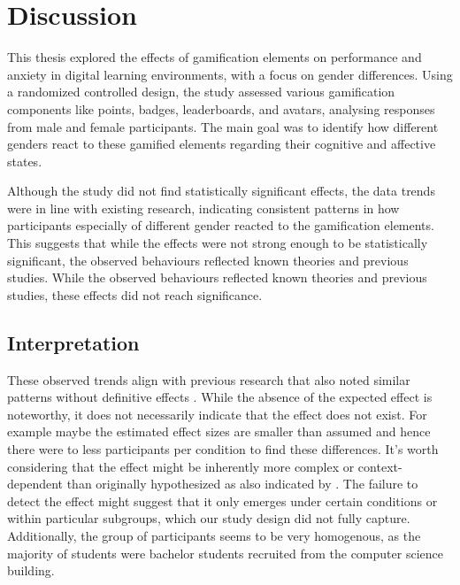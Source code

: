 \section{Discussion}
This thesis explored the effects of gamification elements on performance and anxiety in digital learning environments, with a focus on gender differences.
Using a randomized controlled design, the study assessed various gamification components like points, badges, leaderboards, and avatars, analysing responses from male and female participants.
The main goal was to identify how different genders react to these gamified elements regarding their cognitive and affective states.

Although the study did not find statistically significant effects, the data trends were in line with existing research, indicating consistent patterns in how participants especially of different gender reacted to the gamification elements.
This suggests that while the effects were not strong enough to be statistically significant, the observed behaviours reflected known theories and previous studies.
While the observed behaviours reflected known theories and previous studies, these effects did not reach significance.
\subsection{Interpretation}
These observed trends align with previous research that also noted similar patterns without definitive effects \parencite{dehghanzadehUsingGamificationSupport2024,hamariDoesGamificationWork2014}.
While the absence of the expected effect is noteworthy, it does not necessarily indicate that the effect does not exist.
For example maybe the estimated effect sizes are smaller than assumed and hence there were to less participants per condition to find these differences.
It's worth considering that the effect might be inherently more complex or context-dependent than originally hypothesized as also indicated by \textcite{dehghanzadehUsingGamificationSupport2024,koivistoRiseMotivationalInformation2019,oliveiraTailoredGamificationEducation2023}.
The failure to detect the effect might suggest that it only emerges under certain conditions or within particular subgroups, which our study design did not fully capture.
Additionally, the group of participants seems to be very homogenous, as the majority of students were bachelor students recruited from the computer science building.

